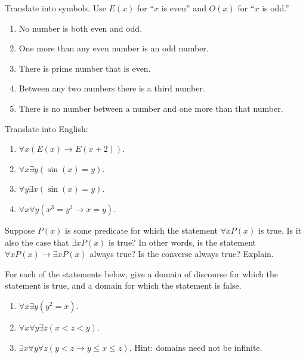 \documentclass[11pt,]{book}
\theoremstyle{ptxplainnotitle}
\theoremstyle{ptxplaintitle}
\theoremstyle{ptxdefinitionnotitle}
\theoremstyle{ptxdefinitiontitle}
\theoremstyle{ptxdefinitionnotitle}
\theoremstyle{ptxdefinitiontitle}
\theoremstyle{ptxdefinitionnotitle}
\theoremstyle{ptxdefinitiontitle}
\theoremstyle{ptxdefinitiontitlenonumber}
\theoremstyle{ptxdefinitiontitlenonumber}
\numberwithin{equation}{chapter}
\newcommand{\imp}{\rightarrow}
\newcommand{\lt}{<}
\begin{document}
\begin{divisionexercise}{17}\hypertarget{exercise-165}{}
\hypertarget{p-2205}{}%
Translate into symbols. Use \(E(x)\) for ``\(x\) is even'' and \(O(x)\) for ``\(x\) is odd.'' \leavevmode%
\begin{enumerate}[label=(\alph*)]
\item\hypertarget{li-1146}{}\hypertarget{p-2206}{}%
No number is both even and odd.%
\item\hypertarget{li-1147}{}\hypertarget{p-2207}{}%
One more than any even number is an odd number.%
\item\hypertarget{li-1148}{}\hypertarget{p-2208}{}%
There is prime number that is even.%
\item\hypertarget{li-1149}{}\hypertarget{p-2209}{}%
Between any two numbers there is a third number.%
\item\hypertarget{li-1150}{}\hypertarget{p-2210}{}%
There is no number between a number and one more than that number.%
\end{enumerate}
%
\end{divisionexercise}%
\begin{divisionexercise}{18}\hypertarget{exercise-166}{}
\hypertarget{p-2212}{}%
Translate into English: \leavevmode%
\begin{enumerate}[label=(\alph*)]
\item\hypertarget{li-1156}{}\(\forall x (E(x) \imp E(x +2))\).%
\item\hypertarget{li-1157}{}\(\forall x \exists y (\sin(x) = y)\).%
\item\hypertarget{li-1158}{}\(\forall y \exists x (\sin(x) = y)\).%
\item\hypertarget{li-1159}{}\(\forall x \forall y (x^3 = y^3 \imp x = y)\).%
\end{enumerate}
%
\end{divisionexercise}%
\begin{divisionexercise}{19}\hypertarget{exercise-167}{}
\hypertarget{p-2218}{}%
Suppose \(P(x)\) is some predicate for which the statement \(\forall x P(x)\) is true. Is it also the case that \(\exists x P(x)\) is true? In other words, is the statement \(\forall x P(x) \imp \exists x P(x)\) always true? Is the converse always true? Explain.%
\end{divisionexercise}%
\begin{divisionexercise}{20}\hypertarget{exercise-168}{}
\hypertarget{p-2219}{}%
For each of the statements below, give a domain of discourse for which the statement is true, and a domain for which the statement is false. \leavevmode%
\begin{enumerate}[label=(\alph*)]
\item\hypertarget{li-1164}{}\(\forall x \exists y (y^2 = x)\).%
\item\hypertarget{li-1165}{}\(\forall x \forall y \exists z (x \lt  z \lt  y)\).%
\item\hypertarget{li-1166}{}\(\exists x \forall y \forall z (y \lt  z \imp y \le x \le z)\).  Hint: domains need not be infinite.%
\end{enumerate}
%
\end{divisionexercise}%
\end{document}
